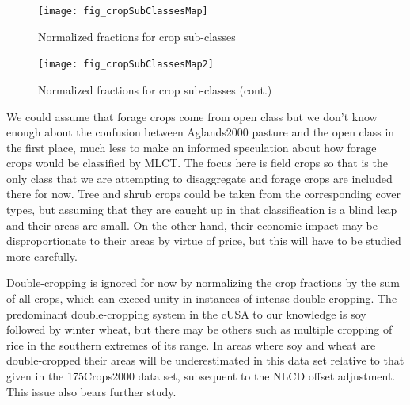 \begin{figure}[ht] 
  \centering

    \texttt{[image: fig\_cropSubClassesMap]}
  \caption{Normalized fractions for crop sub-classes}
  \label{fig:cropSubClassesMap} 
\end{figure} 

\begin{figure}[ht] 
  \centering

    \texttt{[image: fig\_cropSubClassesMap2]}
  \caption{Normalized fractions for crop sub-classes (cont.)}
  \label{fig:cropSubClassesMap2} 
\end{figure} 


We could assume that forage crops come from open class but we don't
know enough about the confusion between Aglands2000 pasture and the
open class in the first place, much less to make an informed
speculation about how forage crops would be classified by MLCT.  The
focus here is field crops so that is the only class that we are
attempting to disaggregate and forage crops are included there for
now.  Tree and shrub crops could be taken from the corresponding cover
types, but assuming that they are caught up in that classification is
a blind leap and their areas are small.  On the other hand, their
economic impact may be disproportionate to their areas by virtue of
price, but this will have to be studied more carefully.

Double-cropping is ignored for now by normalizing the crop fractions
by the sum of all crops, which can exceed unity in instances of
intense double-cropping.  The predominant double-cropping system in
the cUSA to our knowledge is soy followed by winter wheat, but there
may be others such as multiple cropping of rice in the southern
extremes of its range.  In areas where soy and wheat are
double-cropped their areas will be underestimated in this data set
relative to that given in the 175Crops2000 data set, subsequent to the
NLCD offset adjustment.  This issue also bears further study.





